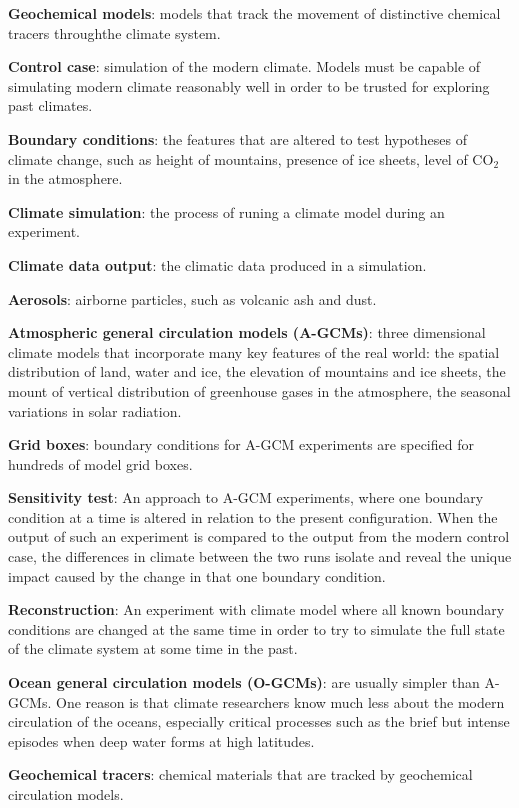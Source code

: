 \textbf{Geochemical models}: models that track the movement of distinctive
chemical tracers throughthe climate system.

\textbf{Control case}: simulation of the modern climate. Models must be
capable of simulating modern climate reasonably well in order to be trusted for
exploring past climates.

\textbf{Boundary conditions}: the features that are altered to test hypotheses
of climate change, such as height of mountains, presence of ice sheets, level
of CO$_2$ in the atmosphere.

\textbf{Climate simulation}: the process of runing a climate model during an
experiment.

\textbf{Climate data output}: the climatic data produced in a simulation.

\textbf{Aerosols}: airborne particles, such as volcanic ash and dust.

\textbf{Atmospheric general circulation models (A-GCMs)}: three dimensional
climate models  that incorporate many key features of the real world: the
spatial distribution of land, water and ice, the elevation of mountains and
ice sheets, the mount of vertical distribution of greenhouse gases in the
atmosphere, the seasonal variations in solar radiation.

\textbf{Grid boxes}: boundary conditions for A-GCM experiments are specified
for hundreds of model grid boxes.

\textbf{Sensitivity test}: An approach to A-GCM experiments, where one
boundary condition at a time is altered in relation to the present
configuration. When the output of such an experiment is compared to the
output from the modern control case, the differences in climate between the
two runs isolate and reveal the unique impact caused by the change in that one
boundary condition.

\textbf{Reconstruction}: An experiment with climate model where all known
boundary conditions are changed at the same time in order to try to simulate
the full state of the climate system at some time in the past.

\textbf{Ocean general circulation models (O-GCMs)}: are usually simpler than
A-GCMs. One reason is that climate researchers know much less about the
modern circulation of the oceans, especially critical processes such as the
brief but intense episodes when deep water forms at high latitudes.

\textbf{Geochemical tracers}: chemical materials that are tracked by
geochemical circulation models.

